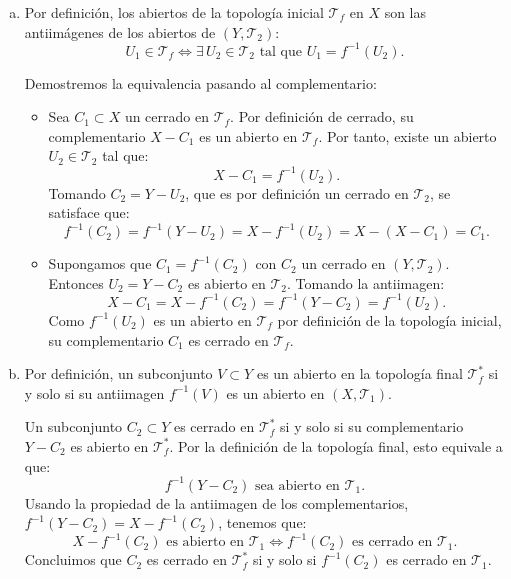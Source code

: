 \begin{sol}
    \begin{enumerate}[a)]
        \item Por definición, los abiertos de la topología inicial $\mathcal{T}_f$ en $X$ son las antiimágenes de los abiertos de $(Y, \mathcal{T}_2)$:
        \[
            U_1 \in \mathcal{T}_f \iff \exists \, U_2 \in \mathcal{T}_2 \text{ tal que } U_1 = f^{-1}(U_2).
        \]
        
        Demostremos la equivalencia pasando al complementario:
        
        \begin{itemize}
            \item [$(\Rightarrow)$] Sea $C_1 \subset X$ un cerrado en $\mathcal{T}_f$. Por definición de cerrado, su complementario $X - C_1$ es un abierto en $\mathcal{T}_f$. Por tanto, existe un abierto $U_2 \in \mathcal{T}_2$ tal que:
            \[
                X - C_1 = f^{-1}(U_2).
            \]
            Tomando $C_2 = Y - U_2$, que es por definición un cerrado en $\mathcal{T}_2$, se satisface que:
            \[
                f^{-1}(C_2) = f^{-1}(Y - U_2) = X - f^{-1}(U_2) = X - (X - C_1) = C_1.
            \]

            \item [$(\Leftarrow)$] Supongamos que $C_1 = f^{-1}(C_2)$ con $C_2$ un cerrado en $(Y, \mathcal{T}_2)$. Entonces $U_2 = Y - C_2$ es abierto en $\mathcal{T}_2$. Tomando la antiimagen:
            \[
                X - C_1 = X - f^{-1}(C_2) = f^{-1}(Y - C_2) = f^{-1}(U_2).
            \]
            Como $f^{-1}(U_2)$ es un abierto en $\mathcal{T}_f$ por definición de la topología inicial, su complementario $C_1$ es cerrado en $\mathcal{T}_f$.
        \end{itemize}

        \item Por definición, un subconjunto $V \subset Y$ es un abierto en la topología final $\mathcal{T}_f^*$ si y solo si su antiimagen $f^{-1}(V)$ es un abierto en $(X, \mathcal{T}_1)$.
        
        Un subconjunto $C_2 \subset Y$ es cerrado en $\mathcal{T}_f^*$ si y solo si su complementario $Y - C_2$ es abierto en $\mathcal{T}_f^*$. Por la definición de la topología final, esto equivale a que:
        \[
            f^{-1}(Y - C_2) \text{ sea abierto en } \mathcal{T}_1.
        \]
        Usando la propiedad de la antiimagen de los complementarios, $f^{-1}(Y - C_2) = X - f^{-1}(C_2)$, tenemos que:
        \[
            X - f^{-1}(C_2) \text{ es abierto en } \mathcal{T}_1 \iff f^{-1}(C_2) \text{ es cerrado en } \mathcal{T}_1.
        \]
        Concluimos que $C_2$ es cerrado en $\mathcal{T}_f^*$ si y solo si $f^{-1}(C_2)$ es cerrado en $\mathcal{T}_1$.
    \end{enumerate}
\end{sol}
